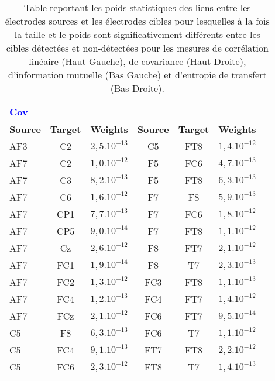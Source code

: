 \begin{table}[!t]
\scriptsize
\caption[Table des résultats des analyses statistiques des tests non-paramétriques par permutation de cluster]{Table reportant les poids statistiques des liens entre les électrodes sources et les électrodes cibles pour lesquelles à la fois la taille et le poids sont significativement différents entre les cibles détectées et non-détectées pour les mesures de corrélation linéaire (Haut Gauche), de covariance (Haut Droite), d'information mutuelle (Bas Gauche) et d'entropie de transfert (Bas Droite).}
\label{tab:table5statstestspermutationcluster}

\begin{multicols}{2}
\begin{tabular}{|l|*{6}{c|}}
\hline
\textcolor{blue}{\textbf{Cov}} & & & & & \\
\hline
\textbf{Source} & \textbf{Target} & \textbf{Weights} & \textbf{Source} & \textbf{Target} & \textbf{Weights} \\
\hline
AF3 & C2 & $2,5.10^{-13}$ & C5 & FT8 & $1,4.10^{-12}$ \\
AF7 & C2 & $1,0.10^{-12}$ & F5 & FC6 & $4,7.10^{-13}$ \\
AF7 & C3 & $8,2.10^{-13}$ & F5 & FT8 & $6,3.10^{-13}$ \\
AF7 & C6 & $1,6.10^{-12}$ & F7 & F8 & $5,9.10^{-13}$ \\
AF7 & CP1 & $7,7.10^{-13}$ & F7 & FC6 & $1,8.10^{-12}$ \\
AF7 & CP5 & $9,0.10^{-14}$ & F7 & FT8 & $1,1.10^{-12}$ \\
AF7 & Cz & $2,6.10^{-12}$ & F8 & FT7 & $2,1.10^{-12}$ \\
AF7 & FC1 & $1,9.10^{-14}$ & F8 & T7 & $2,3.10^{-13}$ \\
AF7 & FC2 & $1,3.10^{-12}$ & FC3 & FT8 & $1,1.10^{-13}$ \\
AF7 & FC4 & $1,2.10^{-13}$ & FC4 & FT7 & $1,4.10^{-12}$ \\
AF7 & FCz & $2,1.10^{-12}$ & FC6 & FT7 & $9,5.10^{-14}$ \\
C5 & F8 & $6,3.10^{-13}$ & FC6 & T7 & $1,1.10^{-12}$ \\
C5 & FC4 & $9,1.10^{-13}$ & FT7 & FT8 & $2,2.10^{-12}$ \\
C5 & FC6 & $2,3.10^{-12}$ & FT8 & T7 & $1,4.10^{-13}$ \\
\hline
\end{tabular}


\end{multicols}
\end{table}
